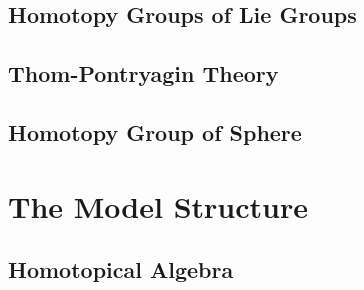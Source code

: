 \documentclass[Total.tex]{subfiles}
\begin{document}
				\section{Homotopy Groups of Lie Groups}
				\section{Thom-Pontryagin Theory}
				\section{Homotopy Group of Sphere}
	
	\chapter{The Model Structure}
		\section{Homotopical Algebra}
\end{document}
